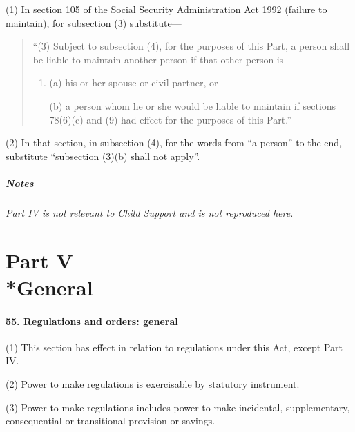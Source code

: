 \documentclass[a4paper]{article}
\newcommand{\parthead}{}
\newcommand\amendment[1]{\subsubsection*{Notes}{\itshape\frenchspacing\footnotesize #1 \par}}
\begin{document}
(1) In section 105 of the Social Security Administration Act 1992 (failure to maintain), for subsection (3) substitute—
\begin{quotation}
“(3) Subject to subsection (4), for the purposes of this Part, a person shall be liable to maintain another person if that other person is—
\begin{enumerate}\item[]
(a) his or her spouse or civil partner, or

(b) a person whom he or she would be liable to maintain if sections 78(6)(c) and (9) had effect for the purposes of this Part.”
\end{enumerate}
\end{quotation}

(2) In that section, in subsection (4), for the words from “a person” to the end, substitute “subsection (3)(b) shall not apply”.

\amendment{Part IV is not relevant to Child Support and is not reproduced here.}


\part[Part V --- General]{Part V\\*General}

\renewcommand\parthead{--- Part V}

\subsection{55. Regulations and orders: general}

(1) This section has effect in relation to regulations under this Act, except Part IV.

(2) Power to make regulations is exercisable by statutory instrument.

(3) Power to make regulations includes power to make incidental, supplementary, consequential or transitional provision or savings.
\end{document}

